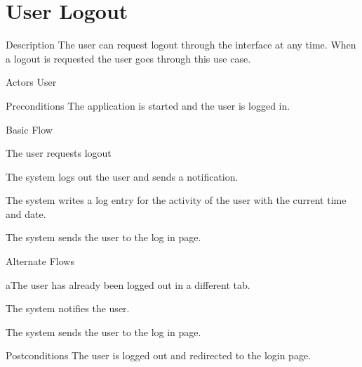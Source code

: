\section{User Logout}

\begin{cpart}{Description}
The user can request logout through the interface at any time. When a logout is requested the user goes through this use case.
\end{cpart}

\begin{cpart}{Actors}
User
\end{cpart}

\begin{cpart}{Preconditions}
The application is started and the user is logged in.
\end{cpart}

\begin{cpartList}{Basic Flow}
  \item The user requests logout
  \item The system logs out the user and sends a notification.
  \item The system writes a log entry for the activity of the user with the current time and date.
  \item The system sends the user to the log in page.
\end{cpartList}

\begin{cpartList}{Alternate Flows}
  \begin{innerList}{2}{a}{The user has already been logged out in a different tab.}
    \item The system notifies the user.
    \item The system sends the user to the log in page.
  \end{innerList}
\end{cpartList}

\begin{cpart}{Postconditions}
The user is logged out and redirected to the login page.
\end{cpart}

\clearpage

